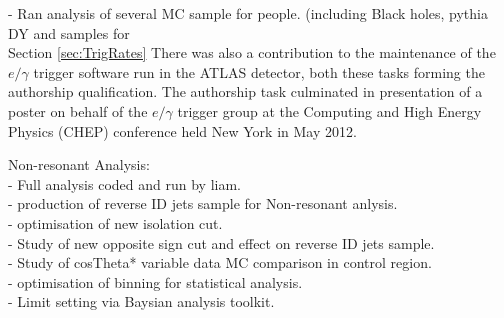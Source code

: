- Ran analysis of several MC sample for people. (including Black holes, pythia DY and samples for \\

Section \ref{sec:TrigRates}
There was also a contribution to the maintenance of the $e/\gamma$ trigger software run in the ATLAS detector, both these tasks forming the authorship qualification. The authorship task culminated in presentation of a poster on behalf of the $e/\gamma$ trigger group at the Computing and High Energy Physics (CHEP) conference held New York in May 2012. 



Non-resonant Analysis:\\

- Full analysis coded and run by liam.\\

- production of reverse ID jets sample for Non-resonant anlysis.\\

- optimisation of new isolation cut.\\

- Study of new opposite sign cut and effect on reverse ID jets sample.\\

- Study of cosTheta* variable data MC comparison in control region.\\

- optimisation of binning for statistical analysis.\\

- Limit setting via Baysian analysis toolkit.\\


